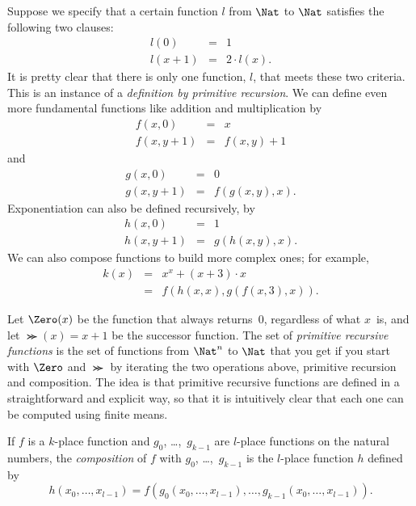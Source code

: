 \documentclass[../../../include/open-logic-section]{subfiles}
\begin{document}

\begin{explain}
Suppose we specify that a certain function $l$ from $\Nat$ to $\Nat$
satisfies the following two clauses:
\begin{eqnarray*}
l(0) & = & 1 \\
l(x+1) & = & 2 \cdot l(x).
\end{eqnarray*}
It is pretty clear that there is only one function, $l$, that meets
these two criteria. This is an instance of a \emph{definition by
  primitive recursion}. We can define even more fundamental functions
like addition and multiplication by
\begin{eqnarray*}
f(x,0) & = & x \\
f(x,y+1) & = & f(x,y)+1
\end{eqnarray*}
and
\begin{eqnarray*}
g(x,0) & = & 0 \\
g(x,y+1) & = & f(g(x,y),x).
\end{eqnarray*}
Exponentiation can also be defined recursively, by
\begin{eqnarray*}
h(x,0) & = & 1 \\
h(x,y+1) & = & g(h(x,y),x).
\end{eqnarray*}
We can also compose functions to build more complex ones; for example,
\begin{eqnarray*}
k(x) & = & x^x + (x + 3) \cdot x \\
& = & f(h(x,x),g(f(x,3),x)).
\end{eqnarray*}

Let $\Zero(x)$ be the function that always returns~$0$, regardless of
what $x$~is, and let $\Succ(x) = x+1$ be the successor function.  The
set of \emph{primitive recursive functions} is the set of functions
from $\Nat^n$ to $\Nat$ that you get if you start with $\Zero$ and
$\Succ$ by iterating the two operations above, primitive recursion and
composition. The idea is that primitive recursive functions are
defined in a straightforward and explicit way, so that it is
intuitively clear that each one can be computed using finite means.
\end{explain}

\begin{defn}
If $f$ is a $k$-place function and $g_0$, \dots,~$g_{k-1}$ are $l$-place
functions on the natural numbers, the \emph{composition} of $f$ with
$g_0$, \dots,~$g_{k-1}$ is the $l$-place function $h$ defined by
\[
h(x_0,\dots,x_{l-1}) =
f(g_0(x_0,\dots,x_{l-1}),\dots,g_{k-1}(x_0,\dots,x_{l-1})) .
\]
\end{defn}
\end{document}
